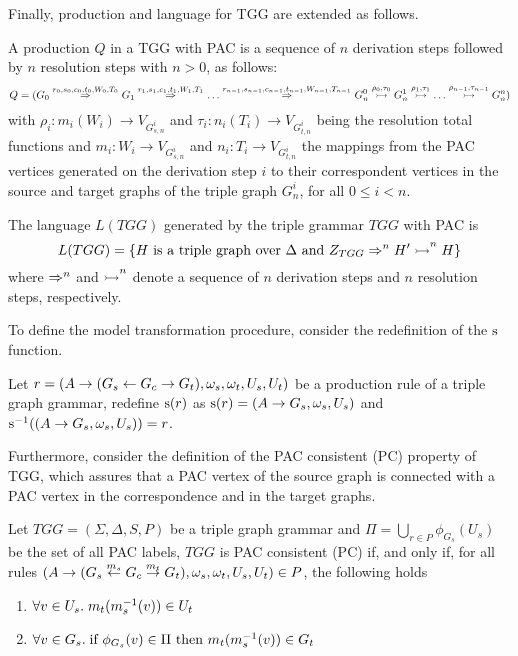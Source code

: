 Finally, production and language for TGG are extended as follows.

\begin{definition}
	A production $Q$ in a TGG with PAC is a sequence of $n$ derivation steps followed by $n$ resolution steps with $n > 0$, as follows:
	\begin{equation*}
	Q = (G_0 \derivpac{r_0}{s_0,c_0,t_0}{W_0,T_0}{} G_1 \derivpac{r_1}{s_1,c_1,t_1}{W_1,T_1}{} \dots \derivpac{r_{n-1}}{s_{n-1},c_{n-1},t_{n-1}}{W_{n-1},T_{n-1}}{} G_n^0 \resolv{\rho_0,\tau_0} G_n^1 \resolv{\rho_1,\tau_1} \dots \resolv{\rho_{n-1},\tau_{n-1}} G_n^n)
	\end{equation*}
	with $\rho_i: m_i(W_i) \to V_{G_{s,n}^i}$ and $\tau_i: n_i(T_i) \to V_{G_{t,n}^i}$ being the resolution total functions and $m_i : W_i \to V_{G_{s,n}^i}$ and $n_i : T_i \to V_{G_{t,n}^i}$ the mappings from the PAC vertices generated on the derivation step $i$ to their correspondent vertices in the source and target graphs of the triple graph $G_n^i$, for all $0 \le i < n$.
\end{definition}

\begin{definition}
	The language $L(TGG)$ generated by the triple grammar $TGG$ with PAC is
	\begin{equation*}
	L(TGG) = \{ H \text{ is a triple graph over } \Delta \text{ and } \startTG{TGG} \tderivpacn{}{n} H' \tresolvn{}{n} H \}
	\end{equation*}
	where $\tderivpacn{}{n}$ and $\tresolvn{}{n}$ denote a sequence of $n$ derivation steps and $n$ resolution steps, respectively.
\end{definition}

To define the model transformation procedure, consider the redefinition of the $\source$ function.

\begin{definition}
	\label{def:sourcepac}
	Let $r = (A \pro (G_s \ms{} G_c \mt{} G_t), \omega_s, \omega_t, U_s, U_t)$ be a production rule of a triple graph grammar, redefine $\source(r)$ as $\source(r) = (A \pro G_s,\omega_s,U_s)$ and $\source^{-1}((A \pro G_s,\omega_s,U_s)) = r$.
\end{definition}

Furthermore, consider the definition of the PAC consistent (PC) property of TGG, which assures that a PAC vertex of the source graph is connected with a PAC vertex in the correspondence and in the target graphs.

\begin{definition}
	Let $TGG = (\Sigma, \Delta, S, P)$ be a triple graph grammar and $\Pi = \bigcup_{r \in P}{\phi_{G_s}(U_s)}$ be the set of all PAC labels, $TGG$ is PAC consistent (PC) if, and only if, for all rules $(A \pro (G_s \ms{m_s} G_c \mt{m_t} G_t), \omega_s, \omega_t, U_s, U_t) \in P$, the following holds
	\begin{enumerate}
		\item $\forall v \in U_s \. m_t(m_s^{-1}(v)) \in U_t$
		\item $\forall v \in G_s \. \text{if } \phi_{G_s}(v) \in \Pi \text{ then } m_t(m_s^{-1}(v)) \in G_t$
	\end{enumerate}
\end{definition}

